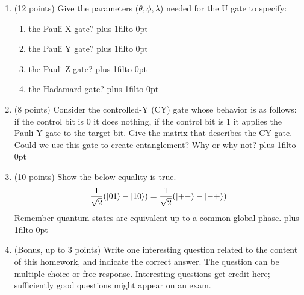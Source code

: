 \documentclass[12pt]{article}
\def\DefaultSpace{1in}
\newcommand{\LeaveSpace}[1][\DefaultSpace]{%
\vskip #1 plus 1fil\relax\hbox to 0pt{\hss} %
}
\begin{document}
\begin{enumerate}[font=\bfseries]
\begin{enumerate}
            \item $\ket{10}$ \LeaveSpace[0.3in]
            \item $\ket{0+}$ \LeaveSpace[0.3in]
            \item $\ket{+-}$ \LeaveSpace[0.3in]
        \end{enumerate}
    \item (12 points) Give the parameters ($\theta,\phi,\lambda$) needed for the U gate to specify:
        \begin{enumerate}
            \item the Pauli X gate? \LeaveSpace[0.3in]
            \item the Pauli Y gate? \LeaveSpace[0.3in]
            \item the Pauli Z gate? \LeaveSpace[0.3in]
            \item the Hadamard gate? \LeaveSpace[0.3in]
        \end{enumerate}
    \item (8 points) Consider the controlled-Y (CY) gate whose behavior is as follows: if the control bit is 0 it does nothing, if the control bit is 1 it applies the Pauli Y gate to the target bit. Give the matrix that describes the CY gate. Could we use this gate to create entanglement? Why or why not? \LeaveSpace[2.5in]
    \item (10 points) Show the below equality is true.
    \[\frac{1}{\sqrt{2}}(\ket{01} - \ket{10}) = \frac{1}{\sqrt{2}}(\ket{+-} - \ket{-+})\]
    Remember quantum states are equivalent up to a common global phase. \LeaveSpace[2.0in]
    \item (Bonus, up to 3 points) Write one interesting question related to the content of this homework, and indicate the correct answer. The question can be multiple-choice or free-response.  Interesting questions get credit here;  sufficiently good questions might appear on an exam.
\end{enumerate}
\end{document}
